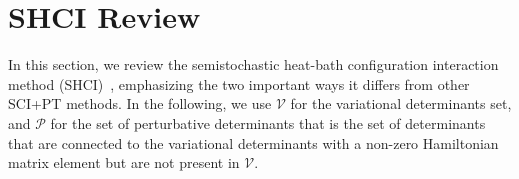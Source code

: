 \documentclass[%
reprint,
 superscriptaddress,
 amsmath,amssymb,
 aps,
]{revtex4-1}
\def\V{\mathcal{V}}
\def\P{\mathcal{P}}
\begin{document}


\section{SHCI Review}
\label{overview}
In this section, we review the semistochastic heat-bath configuration interaction method (SHCI)~\cite{HolTubUmr-JCTC-16,ShaHolJeaAlaUmr-JCTC-17,HolUmrSha-JCP-17},
emphasizing the two important ways it differs from other SCI+PT methods.
In the following, we use $\V$ for the variational determinants set, and $\P$ for the set of perturbative determinants that is the set of determinants that are connected to the variational determinants with a non-zero Hamiltonian matrix element but are not present in $\V$.
\end{document}
